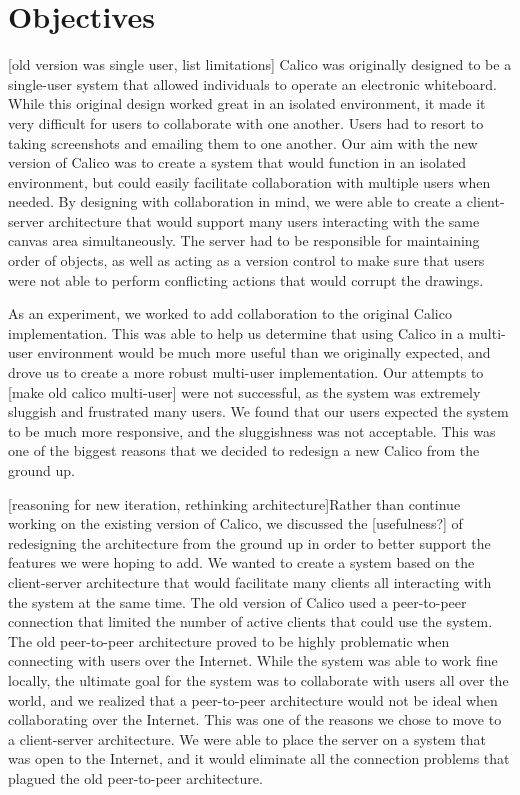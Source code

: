 \chapter{Objectives}

[old version was single user, list limitations] Calico was originally designed to be a single-user system that allowed individuals to operate an electronic whiteboard. While this original design worked great in an isolated environment, it made it very difficult for users to collaborate with one another. Users had to resort to taking screenshots and emailing them to one another.  Our aim with the new version of Calico was to create a system that would function in an isolated environment, but could easily facilitate collaboration with multiple users when needed. By designing with collaboration in mind, we were able to create a client-server architecture that would support many users interacting with the same canvas area simultaneously. The server had to be responsible for maintaining order of objects, as well as acting as a version control to make sure that users were not able to perform conflicting actions that would corrupt the drawings.

As an experiment, we worked to add collaboration to the original Calico implementation. This was able to help us determine that using Calico in a multi-user environment would be much more useful than we originally expected, and drove us to create a more robust multi-user implementation. Our attempts to [make old calico multi-user] were not successful, as the system was extremely sluggish and frustrated many users. We found that our users expected the system to be much more responsive, and the sluggishness was not acceptable. This was one of the biggest reasons that we decided to redesign a new Calico from the ground up.  

[reasoning for new iteration, rethinking architecture]Rather than continue working on the existing version of Calico, we discussed the [usefulness?] of redesigning the architecture from the ground up in order to better support the features we were hoping to add. We wanted to create a system based on the client-server architecture that would facilitate many clients all interacting with the system at the same time. The old version of Calico used a peer-to-peer connection that limited the number of active clients that could use the system. The old peer-to-peer architecture proved to be highly problematic when connecting with users over the Internet. While the system was able to work fine locally, the ultimate goal for the system was to collaborate with users all over the world, and we realized that a peer-to-peer architecture would not be ideal when collaborating over the Internet. This was one of the reasons we chose to move to a client-server architecture. We were able to place the server on a system that was open to the Internet, and it would eliminate all the connection problems that plagued the old peer-to-peer architecture. 

